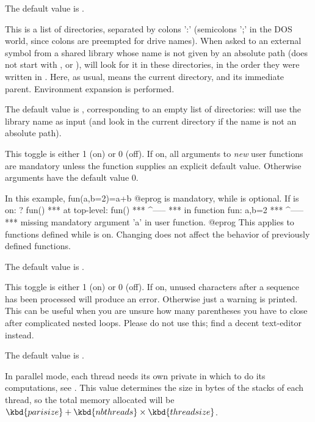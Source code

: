 The default value is .

\label{se:def,sopath}
This is a list of directories, separated by colons ':'
(semicolons ';' in the DOS world, since colons are preempted for drive names).
When asked to  an external symbol from a shared library whose
name is not given by an absolute path (does not start with \kbd{/}, 
or ),  will look for it in these directories, in the order
they were written in . Here, as usual,  means the current
directory, and  its immediate parent. Environment expansion is
performed.

The default value is , corresponding to an empty list of
directories:  will use the library name as input (and look in
the current directory if the name is not an absolute path).

\label{se:def,strictargs}
This toggle is either 1 (on) or 0 (off). If on, all arguments to \emph{new}
user functions are mandatory unless the function supplies an explicit default
value.
Otherwise arguments have the default value $0$.

In this example,
\bprog
  fun(a,b=2)=a+b
@eprog
 is mandatory, while  is optional. If  is on:
\bprog
? fun()
 ***   at top-level: fun()
 ***                 ^-----
 ***   in function fun: a,b=2
 ***                    ^-----
 ***   missing mandatory argument 'a' in user function.
@eprog
This applies to functions defined while  is on. Changing 
does not affect the behavior of previously defined functions.

The default value is .

\label{se:def,strictmatch}
This toggle is either 1 (on) or 0 (off). If on, unused characters after a
sequence has been
processed will produce an error. Otherwise just a warning is printed. This
can be useful when you are unsure how many parentheses you have to close
after complicated nested loops. Please do not use this; find a decent
text-editor instead.

The default value is .

\label{se:def,threadsize}
In parallel mode, each thread needs its own private  in which
to do its computations, see . This value determines the size
in bytes of the stacks of each thread, so the total memory allocated will be
$\kbd{parisize}+\kbd{nbthreads}\times\kbd{threadsize}$.

